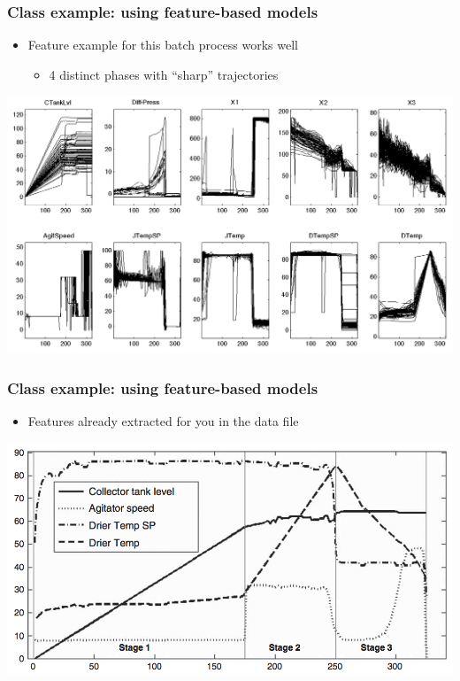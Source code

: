 \begin{frame}\frametitle{Class example: using feature-based models}

	\begin{itemize}
		
		\item	Feature example for this batch process works well
		
				\begin{itemize}
				
					\item	4 distinct phases with ``sharp'' trajectories
				
				\end{itemize}

	\end{itemize}

	\begin{center}
		\includegraphics[width=\textwidth]{images/fmc/fmc-raw-trajectories.png}
	\end{center}

\end{frame}

\begin{frame}\frametitle{Class example: using feature-based models}

	\begin{itemize}
	
		\item	Features already extracted for you in the data file
	
	\end{itemize}

	\begin{center}
		\includegraphics[width=\textwidth]{images/fmc/fmc-phases-4-trajectories.png}
	\end{center}
	
\end{frame}

